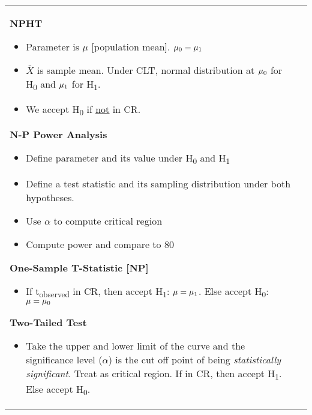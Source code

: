 \documentclass[6pt]{article}
\begin{document}
\begin{scriptsize}
\begin{tabular}{l | l}

\parbox{0.5\textwidth}{

\begin{normalsize}
\textbf{NPHT}
\end{normalsize}
\begin{itemize}

\item Parameter is $\mu$ [population mean]. $\mu\textsubscript{0} = \mu\textsubscript{1}$
\item $\bar{X}$ is sample mean. Under CLT, normal distribution at $\mu\textsubscript{0}$ for H\textsubscript{0} and $\mu\textsubscript{1}$ for H\textsubscript{1}.
\item We accept H\textsubscript{0} if \underline{\underline{not}} in CR.

\end{itemize}
\begin{normalsize}
\textbf{N-P Power Analysis}
\end{normalsize}
\begin{itemize}
\item Define parameter and its value under H\textsubscript{0} and H\textsubscript{1}
\item Define a test statistic and its sampling distribution under both hypotheses.
\item Use $\alpha$ to compute critical region
\item Compute power and compare to 80%
\end{itemize}
\begin{normalsize}
\textbf{One-Sample T-Statistic [NP]}
\end{normalsize}
\begin{itemize}
\item If t\textsubscript{observed} in CR, then accept H\textsubscript{1}: $\mu = \mu\textsubscript{1}$. Else accept H\textsubscript{0}: $\mu = \mu\textsubscript{0}$
\end{itemize}
\begin{normalsize}
\textbf{Two-Tailed Test}
\end{normalsize}
\begin{itemize}
\item Take the upper and lower limit of the curve and the significance level ($\alpha$) is the cut off point of being \emph{statistically significant}. Treat as critical region. If in CR, then accept H\textsubscript{1}. Else accept H\textsubscript{0}.
\end{itemize}

}
\end{tabular}
\end{scriptsize}
\end{document}
